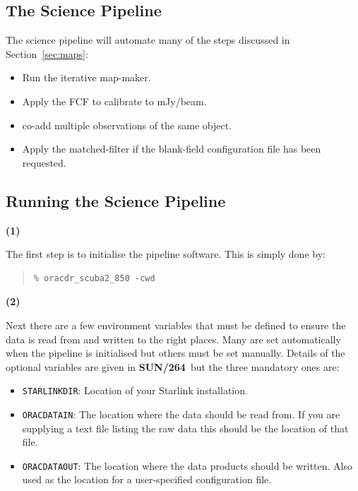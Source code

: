 \documentclass[twoside,11pt]{article}
\newcommand{\htmlref}[2]{#1}
\newcommand{\latexhtml}[2]{#1}
\newcommand{\xref}[3]{#1}
\newcommand{\xlabel}[1]{}
\renewcommand{\_}{\texttt{\symbol{95}}}
\newenvironment{myquote}{\begin{quote}\begin{small}}{\end{small}\end{quote}}
\newcommand{\param}[1]{\texttt{#1}}
\newcommand{\pipelinesun}{\xref{\textbf{SUN/264}}{sun264}{}}
\newcommand{\cref}[3]{\latexhtml{#1~\ref{#2}}{\htmlref{#3}{#2}}}
\begin{document}
\subsection{\xlabel{science_pl}The Science Pipeline}
The science pipeline will automate many of the steps discussed in
\cref{Section}{sec:maps}{Reducing your data}:
\vspace{-0.3cm}
\begin{itemize}\itemsep-0.3em
\item Run the iterative map-maker.
\item Apply the FCF to calibrate to mJy/beam.
\item co-add multiple observations of the same object.
\item Apply the matched-filter if the blank-field configuration file
has been requested.
\end{itemize}

\subsection{\xlabel{running_pl}Running the Science Pipeline}
\label{sec:runpl}
\begin{minipage}[t]{0.05\linewidth}
\textbf{(1)}
\end{minipage}
\begin{minipage}[t]{0.95\linewidth}
The first step is to initialise the pipeline software. This is simply done by:
\begin{myquote}
\begin{verbatim}
% oracdr_scuba2_850 -cwd

\end{verbatim}
\end{myquote}
\end{minipage}

\begin{minipage}[t]{0.05\linewidth}
\textbf{(2)}
\end{minipage}
\begin{minipage}[t]{0.95\linewidth}
Next there are a few environment variables that must be defined to
ensure the data is read from and written to the right places. Many are
set automatically when the pipeline is initialised but others must be
set manually. Details of the optional variables are given in
\pipelinesun\ but the three mandatory ones are:
\begin{itemize}\itemsep-0.1em
\item \param{STARLINK\_DIR}: Location of your Starlink installation.
\item \param{ORAC\_DATA\_IN}: The location where the data should be read from.
If you are supplying a text file listing the raw data this should be the
location of that file.
\item \param{ORAC\_DATA\_OUT}: The location where the data products should be
written. Also used as the location for a user-specified configuration file.\\
\end{itemize}
\end{minipage}
\end{document}

